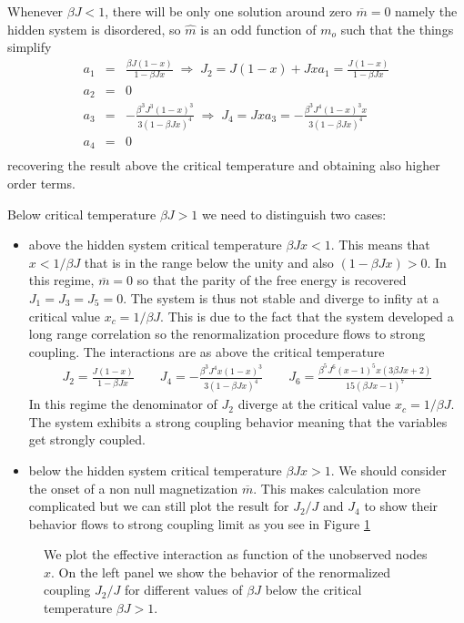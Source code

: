 \documentclass[aps,pre,noshowpacs]{revtex4}
\begin{document}
Whenever $\beta J <1$, there will be only one solution around zero $\overline{m}=0$ namely the hidden system is disordered, so $\hat{m}$ is an odd function of $m_o$ such that the things simplify
\begin{eqnarray}
a_1&=& \frac{\beta  J (1-x)}{1-\beta  J x} \;\Rightarrow \; J_2=J(1-x) + Jx a_1=\frac{J(1-x)}{1-\beta J x}\nonumber \\
a_2 &=& 0 \nonumber\\
a_3 &=& -\frac{\beta ^3 J^3 (1-x)^3}{3 (1-\beta  J x)^4} \;\Rightarrow \; J_4= Jx a_3=-\frac{\beta^3 J^4 (1-x)^3 x}{3(1-\beta J x)^4}\nonumber\\
a_4 &=& 0\nonumber\\
\end{eqnarray}
recovering the result above the critical temperature and obtaining also higher order terms.

Below critical temperature $\beta J>1$ we need to distinguish two cases: 
\begin{itemize}
\item above the hidden system critical temperature $\beta J x<1$. This means that $x<1/\beta J$ that is in the range below the unity  and also $(1-\beta J x )>0$. In this regime, $\overline{m}=0$ so that the parity of the free energy is recovered $J_1=J_3=J_5=0$.
The system is thus not stable and diverge to infity at a critical value $x_c=1/\beta J$. This is due to the fact that the system developed a long range correlation so the renormalization procedure
flows to strong coupling. The interactions are as above the critical temperature
\begin{eqnarray}
J_2= \frac{J (1-x)}{1-\beta  J x} \qquad J_4=-\frac{\beta ^3 J^4 x (1-x)^3 }{3 (1-\beta  J x)^4} \qquad J_6 = \frac{\beta ^5 J^6 (x-1)^5 x (3 \beta  J x+2)}{15 (\beta  J x-1)^7}
\end{eqnarray}
In this regime the denominator of $J_2$ diverge at the critical value $x_c=1/\beta J$. The system exhibits a strong coupling behavior meaning that the variables get strongly coupled. 
\item below the hidden system critical temperature $\beta J x >1$. We should consider the onset of a non null magnetization $\overline{m}$. This makes calculation more complicated but we can still plot the result for $J_2/J$ and $J_4$ to show their 
behavior flows to strong coupling limit as you see in  Figure \ref{fig:belowTc}
\end{itemize}
\begin{figure}
\caption{We plot the effective interaction as function of the unobserved nodes $x$. On the left panel we show the behavior of 
the renormalized coupling $J_2/J$ for different values of $\beta J$ below the critical temperature $\beta J >1$.}
\label{fig:belowTc}
\end{figure}
\end{document}
